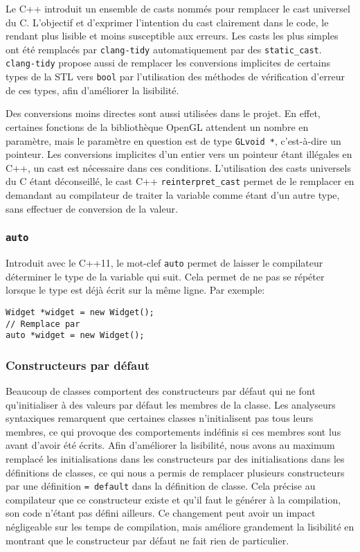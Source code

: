 Le C++ introduit un ensemble de casts nommés pour remplacer le cast
universel du C. L'objectif et d'exprimer l'intention du cast clairement
dans le code, le rendant plus lisible et moins susceptible aux erreurs.
Les casts les plus simples ont été remplacés par \texttt{clang-tidy}
automatiquement par des \texttt{static\_cast}. \texttt{clang-tidy}
propose aussi de remplacer les conversions implicites de certains types
de la STL vers \texttt{bool} par l'utilisation des méthodes de
vérification d'erreur de ces types, afin d'améliorer la lisibilité.

Des conversions moins directes sont aussi utilisées dans le projet. En
effet, certaines fonctions de la bibliothèque OpenGL attendent un nombre
en paramètre, mais le paramètre en question est de type
\texttt{GLvoid\ *}, c'est-à-dire un pointeur. Les conversions implicites
d'un entier vers un pointeur étant illégales en C++, un cast est
nécessaire dans ces conditions. L'utilisation des casts universels du C
étant déconseillé, le cast C++ \texttt{reinterpret\_cast} permet de le
remplacer en demandant au compilateur de traiter la variable comme étant
d'un autre type, sans effectuer de conversion de la valeur.

\subsubsection{\texorpdfstring{\texttt{auto}}{auto}}

Introduit avec le C++11, le mot-clef \texttt{auto} permet de laisser le
compilateur déterminer le type de la variable qui suit. Cela permet de
ne pas se répéter lorsque le type est déjà écrit sur la même ligne. Par
exemple:

\lstset{language=C++}
\begin{lstlisting}
Widget *widget = new Widget();
// Remplace par
auto *widget = new Widget();
\end{lstlisting}

\subsubsection{Constructeurs par défaut}

Beaucoup de classes comportent des constructeurs par défaut qui ne font
qu'initialiser à des valeurs par défaut les membres de la classe. Les
analyseurs syntaxiques remarquent que certaines classes n'initialisent
pas tous leurs membres, ce qui provoque des comportements indéfinis si
ces membres sont lus avant d'avoir été écrits. Afin d'améliorer la
lisibilité, nous avons au maximum remplacé les initialisations dans les
constructeurs par des initialisations dans les définitions de classes,
ce qui nous a permis de remplacer plusieurs constructeurs par une
définition \texttt{=\ default} dans la définition de classe. Cela
précise au compilateur que ce constructeur existe et qu'il faut le
générer à la compilation, son code n'étant pas défini ailleurs. Ce
changement peut avoir un impact négligeable sur les temps de
compilation, mais améliore grandement la lisibilité en montrant que le
constructeur par défaut ne fait rien de particulier.

